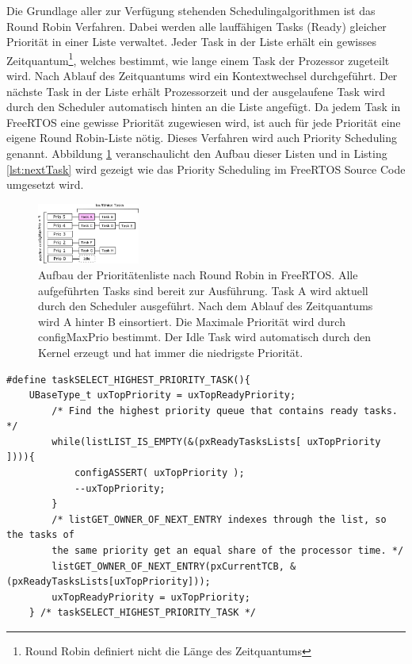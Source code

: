Die Grundlage aller zur Verfügung stehenden Scheduling\-algorithmen ist das Round Robin Verfahren\cite{9783827373427}. Dabei werden alle lauf\-fäh\-igen Tasks (Ready) gleicher Priorität in einer Liste verwaltet. Jeder Task in der Liste erhält ein gewisses Zeitquantum\footnote{Round Robin definiert nicht die Länge des Zeitquantums}, welches bestimmt, wie lange einem Task der Prozessor zugeteilt wird. Nach Ablauf des Zeitquantums wird ein Kontextwechsel durchgeführt. Der näch\-ste Task in der Liste erhält Prozessorzeit und der ausgelaufene Task wird durch den Scheduler automatisch hinten an die Liste angefügt. Da jedem Task in FreeRTOS eine gewisse Priorität zugewiesen wird, ist auch für jede Priorität eine eigene Round Robin-Liste nötig. Dieses Verfahren wird auch Priority Scheduling \cite{9783827373427} genannt. Abbildung \ref{fig:PrioList1} veranschaulicht den Aufbau dieser Listen und in Listing \ref{lst:nextTask} wird gezeigt wie das Priority Scheduling im FreeRTOS Source Code umgesetzt wird. 
\begin{figure}[htb]
	\centering
		\includegraphics[width=0.3\textwidth]{Pictures/Scheduling/PrioList1.png}
	\caption{Aufbau der Prioritätenliste nach Round Robin in FreeRTOS. Alle aufgeführten Tasks sind bereit zur Ausführung. Task A wird aktuell durch den Scheduler ausgeführt. Nach dem Ablauf des Zeitquantums wird A hinter B einsortiert. Die Maximale Priorität wird durch configMaxPrio bestimmt. Der Idle Task wird automatisch durch den Kernel erzeugt und hat immer die niedrigste Priorität. }
	\label{fig:PrioList1}
\end{figure}
\begin{lstlisting}[caption={FreeRTOS Source zur Priroty Task Selection aus Task.c. Alle lauffähigen Tasks werden in einem Array verwaltet pxReadyTaskLists. Die Listen verwalten sich durch Referenz-Pointer in den TCBs der einzelnen Tasks.}, linewidth=8cm,captionpos=b, label=lst:nextTask, float=hbt]
#define taskSELECT_HIGHEST_PRIORITY_TASK(){																									
	UBaseType_t uxTopPriority = uxTopReadyPriority;														
		/* Find the highest priority queue that contains ready tasks. */								
		while(listLIST_IS_EMPTY(&(pxReadyTasksLists[ uxTopPriority ]))){																								
			configASSERT( uxTopPriority );																
			--uxTopPriority;																			
		}																								
		/* listGET_OWNER_OF_NEXT_ENTRY indexes through the list, so the tasks of						
		the	same priority get an equal share of the processor time. */									
		listGET_OWNER_OF_NEXT_ENTRY(pxCurrentTCB, &(pxReadyTasksLists[uxTopPriority]));			
		uxTopReadyPriority = uxTopPriority;																
	} /* taskSELECT_HIGHEST_PRIORITY_TASK */
\end{lstlisting}
